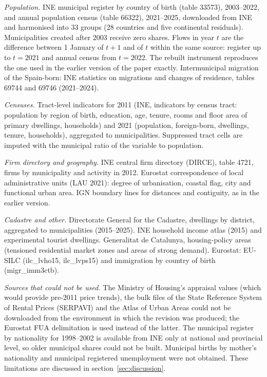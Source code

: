 \documentclass[11pt,a4paper]{article}
\begin{document}
\textit{Population.} INE municipal register by country of birth (table 33573), 2003--2022, and annual population census (table 66322), 2021--2025, downloaded from INE and harmonised into 33 groups (28 countries and five continental residuals). Municipalities created after 2003 receive zero shares. Flows in year $t$ are the difference between 1 January of $t+1$ and of $t$ within the same source: register up to $t=2021$ and annual census from $t=2022$. The rebuilt instrument reproduces the one used in the earlier version of the paper exactly. Intermunicipal migration of the Spain-born: INE statistics on migrations and changes of residence, tables 69744 and 69746 (2021--2024).

\textit{Censuses.} Tract-level indicators for 2011 (INE, indicators by census tract: population by region of birth, education, age, tenure, rooms and floor area of primary dwellings, households) and 2021 (population, foreign-born, dwellings, tenure, households), aggregated to municipalities. Suppressed tract cells are imputed with the municipal ratio of the variable to population.

\textit{Firm directory and geography.} INE central firm directory (DIRCE), table 4721, firms by municipality and activity in 2012. Eurostat correspondence of local administrative units (LAU 2021): degree of urbanisation, coastal flag, city and functional urban area. IGN boundary lines for distances and contiguity, as in the earlier version.

\textit{Cadastre and other.} Directorate General for the Cadastre, dwellings by district, aggregated to municipalities (2015--2025). INE household income atlas (2015) and experimental tourist dwellings. Generalitat de Catalunya, housing-policy areas (tensioned residential market zones and areas of strong demand). Eurostat: EU-SILC (ilc\_lvho15, ilc\_lvps15) and immigration by country of birth (migr\_imm3ctb).

\textit{Sources that could not be used.} The Ministry of Housing's appraisal values (which would provide pre-2011 price trends), the bulk files of the State Reference System of Rental Prices (SERPAVI) and the Atlas of Urban Areas could not be downloaded from the environment in which the revision was produced; the Eurostat FUA delimitation is used instead of the latter. The municipal register by nationality for 1998--2002 is available from INE only at national and provincial level, so older municipal shares could not be built. Municipal births by mother's nationality and municipal registered unemployment were not obtained. These limitations are discussed in section~\ref{sec:discussion}.
\end{document}
